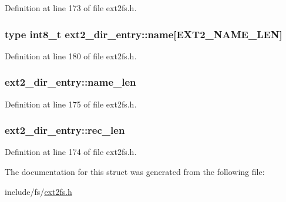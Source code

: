 \-Definition at line 173 of file ext2fs.\-h.

\hypertarget{structext2__dir__entry_a125bd2ee71a4dfe8ce6f3310932bfc15}{
\subsubsection[{name}]{ type {\bf int8\-\_\-t} {\bf ext2\-\_\-dir\-\_\-entry\-::name}\mbox{[}{\bf \-E\-X\-T2\-\_\-\-N\-A\-M\-E\-\_\-\-L\-E\-N}\mbox{]}}}\label{structext2__dir__entry_a125bd2ee71a4dfe8ce6f3310932bfc15}


\-Definition at line 180 of file ext2fs.\-h.

\hypertarget{structext2__dir__entry_a12cf64436f759f163233b581a0eebe5f}{
\subsubsection[{name\-\_\-len}]{ {\bf ext2\-\_\-dir\-\_\-entry\-::name\-\_\-len}}}\label{structext2__dir__entry_a12cf64436f759f163233b581a0eebe5f}


\-Definition at line 175 of file ext2fs.\-h.

\hypertarget{structext2__dir__entry_a41bbc1d811b1585d250f65ac9fe4d5ea}{
\subsubsection[{rec\-\_\-len}]{ {\bf ext2\-\_\-dir\-\_\-entry\-::rec\-\_\-len}}}\label{structext2__dir__entry_a41bbc1d811b1585d250f65ac9fe4d5ea}


\-Definition at line 174 of file ext2fs.\-h.



\-The documentation for this struct was generated from the following file\-:\begin{DoxyCompactItemize}
\item 
include/fs/\hyperlink{ext2fs_8h}{ext2fs.\-h}\end{DoxyCompactItemize}
